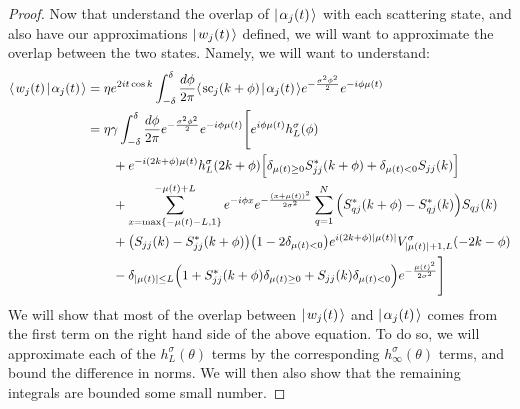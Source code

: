 \documentclass[../thesis-main/thesis-main]{subfiles}
\begin{document}
\begin{proof}
Now that understand the overlap of $|\mspace{2mu} \alpha_j(t) \mspace{2mu} \rangle$ with each scattering state, and also have our approximations $|\mspace{2mu} w_j(t) \mspace{2mu} \rangle$ defined, we will want to approximate the overlap between the two states.  Namely, we will want to understand:
\begin{align}
  \langle\mspace{2mu} w_j(t) \mspace{2mu} | \mspace{2mu} \alpha_j(t)\mspace{2mu} \rangle &= \eta e^{2 i t \cos k} \int_{-\delta}^\delta \frac{d\phi}{2\pi} \langle\mspace{2mu} \text{sc}_j(k+\phi) \mspace{2mu} | \mspace{2mu} \alpha_j(t)\mspace{2mu} \rangle  e^{-\frac{\sigma^2\phi^2}{2}} e^{ - i \phi \mu(t)}\\
  &= \eta \gamma \int_{-\delta}^\delta \frac{d\phi}{2\pi} e^{-\frac{\sigma^2 \phi^2}{2}} e^{-i\phi \mu(t)}\Bigg[e^{ i \phi \mu(t)} h_L^\sigma(\phi) \nonumber\\
  &\qquad+ e^{-i (2k+\phi) \mu(t)} h_L^\sigma(2k+\phi)\Big[\delta_{\mu(t) \geq 0} S_{jj}^*(k+\phi) + \delta_{\mu(t) < 0} S_{jj}(k) \Big]\nonumber\\
  &\qquad  + \sum_{x=\max\{-\mu(t) - L,1\}}^{-\mu(t)+L} e^{-i\phi x} e^{-\frac{(x+\mu(t))^2}{2\sigma^2}} \sum_{q=1}^N \Big(S_{qj}^*(k+\phi) -S_{qj}^*(k)  \Big)S_{qj}(k) \nonumber\\
 & \qquad+ \big(S_{jj}(k) - S_{jj}^*(k+\phi)\big)\big(1 - 2\delta_{\mu(t) < 0}\big)e^{i(2k+\phi)|\mu(t)|} V_{|\mu(t)| + 1,L}^\sigma(-2k-\phi)\nonumber\\
  &\qquad - \delta_{|\mu(t)| \leq L} \Big(1 + S_{jj}^*(k+\phi) \delta_{\mu(t)\geq 0} + S_{jj}(k) \delta_{\mu(t)< 0}\Big)e^{-\frac{\mu(t)^2}{2\sigma^2}} \Bigg]\label{eq:wa_overlap_terms}
\end{align}
We will show that most of the overlap between $|\mspace{2mu} w_j(t) \mspace{2mu} \rangle$ and $|\mspace{2mu} \alpha_j(t) \mspace{2mu} \rangle$ comes from the first term on the right hand side of the above equation.  To do so, we will approximate each of the $h_L^\sigma(\theta)$ terms by the corresponding $h_\infty^\sigma(\theta)$ terms, and bound the difference in norms.  We will then also show that the remaining integrals are bounded some small number.


\end{proof}
\end{document}
